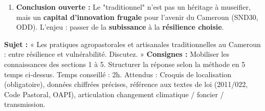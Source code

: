 \documentclass[11pt]{article}
\begin{document}
\begin{methode}
\begin{enumerate}
        \begin{itemize}
            \item Institutionnel : Application Codes (Pastoral, Pêche, Artisanat), Réforme foncière, OAPI/IG.
            \item Économique : GIC/Coopératives, Circuits courts, Label, Financement vert/climat (Fonds Vert, Adaptation).
            \item Technique : Hybridation accompagnée (R\&D participative : IRAD, Universités, Artisans), Énergies renouvelables (solaire séchage poisson, biogaz cuisson poterie).
            \item Humain : Formation duale, Éducation au patrimoine, Tourisme responsable charte communautaire.
        \end{itemize}
    \item \textbf{Conclusion ouverte :} Le "traditionnel" n'est pas un héritage à museifier, mais un \textbf{capital d'innovation frugale} pour l'avenir du Cameroun (SND30, ODD). L'enjeu : passer de la \textbf{subissance} à la \textbf{résilience choisie}.
\end{enumerate}
\end{methode}

\begin{exercice}
\textbf{Sujet :} « Les pratiques agropastorales et artisanales traditionnelles au Cameroun : entre résilience et vulnérabilité. Discutez. »
\textbf{Consignes :} Mobiliser les connaissances des sections 1 à 5. Structurer la réponse selon la méthode en 5 temps ci-dessus. Temps conseillé : 2h. Attendus : Croquis de localisation (obligatoire), données chiffrées précises, référence aux textes de loi (2011/022, Code Pastoral, OAPI), articulation changement climatique / foncier / transmission.
\end{exercice}
\end{document}
